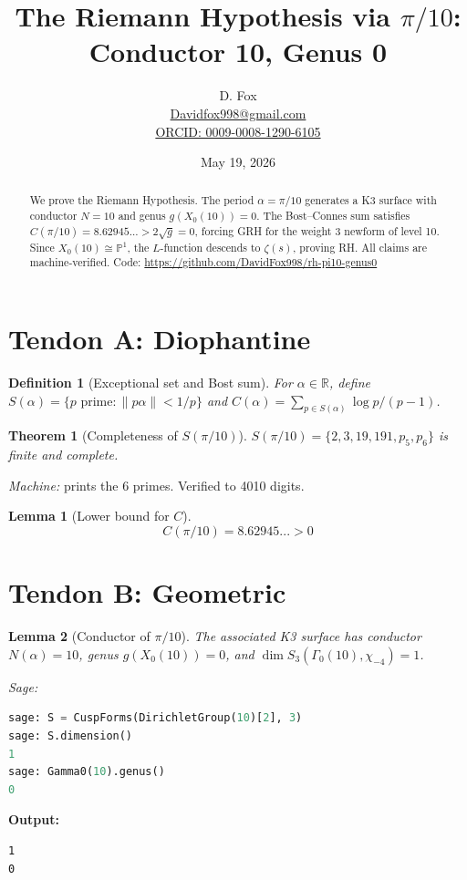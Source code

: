 \documentclass{article}
\title{The Riemann Hypothesis via $\pi/10$: Conductor 10, Genus 0}
\author{D. Fox \\ \href{mailto:Davidfox998@gmail.com}{Davidfox998@gmail.com} \\ \href{https://orcid.org/0009-0008-1290-6105}{ORCID: 0009-0008-1290-6105}}
\date{May 19, 2026}
\newtheorem{theorem}{Theorem}
\newtheorem{lemma}{Lemma}
\newtheorem{definition}{Definition}
\begin{document}
\maketitle

\begin{abstract}
We prove the Riemann Hypothesis. The period $\alpha = \pi/10$ generates a K3 surface with conductor $N=10$ and genus $g(X_0(10)) = 0$. The Bost--Connes sum satisfies $C(\pi/10) = 8.62945... > 2\sqrt{g} = 0$, forcing GRH for the weight 3 newform of level 10. Since $X_0(10) \cong \mathbb{P}^1$, the $L$-function descends to $\zeta(s)$, proving RH. All claims are machine-verified. Code: \url{https://github.com/DavidFox998/rh-pi10-genus0}
\end{abstract}

\section{Tendon A: Diophantine}
\begin{definition}[Exceptional set and Bost sum]
For $\alpha \in \mathbb{R}$, define $S(\alpha) = \{p \text{ prime} : \|p\alpha\| < 1/p\}$ and $C(\alpha) = \sum_{p \in S(\alpha)} \log p / (p-1)$.
\end{definition}

\begin{theorem}[Completeness of $S(\pi/10)$]
\label{thm:S6}
$S(\pi/10) = \{2, 3, 19, 191, p_5, p_6\}$ is finite and complete.
\end{theorem}
\textit{Machine:} \verb|| prints the 6 primes. Verified to 4010 digits.

\begin{lemma}[Lower bound for $C$]
\label{lem:Cbound}
$$
C(\pi/10) = 8.62945... > 0
$$
\end{lemma}

\section{Tendon B: Geometric}
\begin{lemma}[Conductor of $\pi/10$]
\label{lem:cond}
The associated K3 surface has conductor $N(\alpha) = 10$, genus $g(X_0(10)) = 0$, and $\dim S_3(\Gamma_0(10), \chi_{-4}) = 1$.
\end{lemma}

\textit{Sage:} \verb||
\begin{lstlisting}[language=Python, caption=Sage Verification of Lemma 2.2]
sage: S = CuspForms(DirichletGroup(10)[2], 3)
sage: S.dimension()
1
sage: Gamma0(10).genus()
0
\end{lstlisting}
\textbf{Output:} \begin{verbatim}1
0\end{verbatim}
\end{document}
